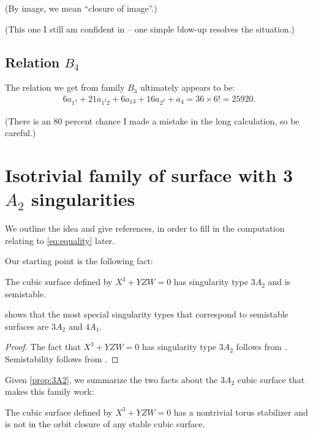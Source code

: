 \documentclass[12pt,reqno]{amsart}
\numberwithin{equation}{section}
\begin{document}
(By image, we mean ``closure of image''.)

(This one I still am confident in -- one simple blow-up resolves the situation.)


\subsection{Relation $B_4$}
\label{sec:relation-b_4}

The relation we get from family $B_3$ ultimately appears to be:
\begin{align}
  \label{eq:relationB4}
  6a_{1^{4}} + 21a_{1^{2}2}+6a_{13}+16a_{2^{2}}+a_{4} = 36 \times 6! = 25920.
\end{align}

(There is an 80 percent chance I made a mistake in the long
calculation, so be careful.)

\section{Isotrivial family of surface with 3 $A_2$ singularities}
\label{sec:isotrivial3A2}

We outline the idea and give references, in order to fill in the computation relating to \eqref{eq:equality} later. 

Our starting point is the following fact:
\begin{proposition}
\label{prop:3A2}
The cubic surface defined by $X^3 + YZW = 0$ has singularity type $3A_2$ and is semistable.
\end{proposition}

\begin{remark}
\cite[Proposition 2.2]{N05} shows that the most special singularity types that correspond to semistable surfaces are $3A_2$ and $4A_1$. 
\end{remark}

\begin{proof}
The fact that $X^3 + YZW=0$ has singularity type $3A_2$ follows from \cite[Proof of 3.1.12]{N00}. Semistability follows from \cite[Proposition 2.3]{N05}.
\end{proof}

Given \autoref{prop:3A2}, we summarize the two facts about the $3A_2$ cubic surface that makes this family work:
\begin{proposition}
\label{prop:twofacts}
The cubic surface defined by $X^3 + YZW = 0$ has a nontrivial torus stabilizer and is not in the orbit closure of any stable cubic surface.
\end{proposition}
\end{document}
